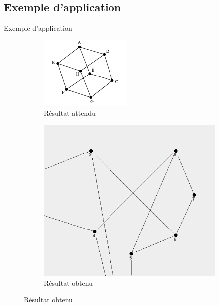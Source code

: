 \documentclass[aspectratio=169,xcolor=dvipsnames]{beamer}
\begin{document}
\subsection{Exemple d'application}
    \begin{frame}{Exemple d'application}
        \begin{figure}
        \centering
            \begin{subfigure}[b]{0.4\textwidth}
                \includegraphics[width=\textwidth]{cube_des.png}
                \caption{Résultat attendu}
                \label{fig:cube}
            \end{subfigure}
            \begin{subfigure}[b]{0.4\textwidth}
                \includegraphics[width=\textwidth]{cube_err.png}
                \caption{Résultat obtenu}
                \label{fig:cube_err}
            \end{subfigure}
        \label{fig:images}
        \end{figure}
    \end{frame}
\end{document}
